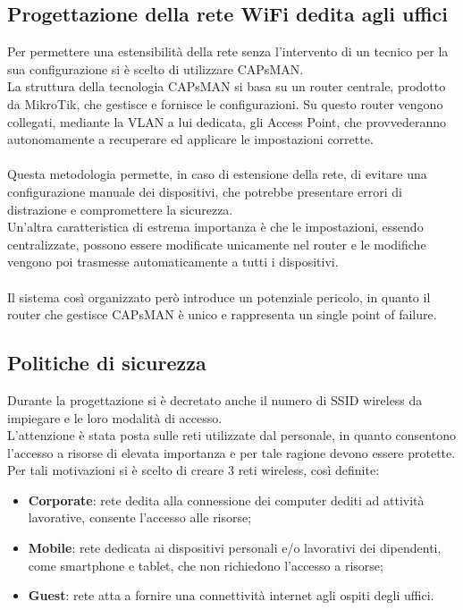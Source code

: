 \documentclass[Realizzazione.tex]{subfiles}
\begin{document}
\subsection{Progettazione della rete WiFi dedita agli uffici}
Per permettere una estensibilità della rete senza l'intervento di un tecnico per la sua configurazione si è scelto di utilizzare CAPsMAN. \\
La struttura della tecnologia CAPsMAN si basa su un router centrale, prodotto da MikroTik, che gestisce e fornisce le configurazioni. Su questo router vengono collegati, mediante la VLAN a lui dedicata, gli Access Point, che provvederanno autonomamente a recuperare ed applicare le impostazioni corrette. \\\\
Questa metodologia permette, in caso di estensione della rete, di evitare una configurazione manuale dei dispositivi, che potrebbe presentare errori di distrazione e compromettere la sicurezza. \\
Un'altra caratteristica di estrema importanza è che le impostazioni, essendo centralizzate, possono essere modificate unicamente nel router e le modifiche vengono poi trasmesse automaticamente a tutti i dispositivi. \\\\
Il sistema così organizzato però introduce un potenziale pericolo, in quanto il router che gestisce CAPsMAN è unico e rappresenta un single point of failure.

\newpage
\subsection{Politiche di sicurezza}
Durante la progettazione si è decretato anche il numero di SSID wireless da impiegare e le loro modalità di accesso. \\
L'attenzione è stata posta sulle reti utilizzate dal personale, in quanto consentono l'accesso a risorse di elevata importanza e per tale ragione devono essere protette. \\
Per tali motivazioni si è scelto di creare 3 reti wireless, così definite:
\begin{itemize}
	\item \textbf{Corporate}: rete dedita alla connessione dei computer dediti ad attività lavorative, consente l'accesso alle risorse;
	\item \textbf{Mobile}: rete dedicata ai dispositivi personali e/o lavorativi dei dipendenti, come smartphone e tablet, che non richiedono l'accesso a risorse;
	\item \textbf{Guest}: rete atta a fornire una connettività internet agli ospiti degli uffici.
\end{itemize}
\end{document}
